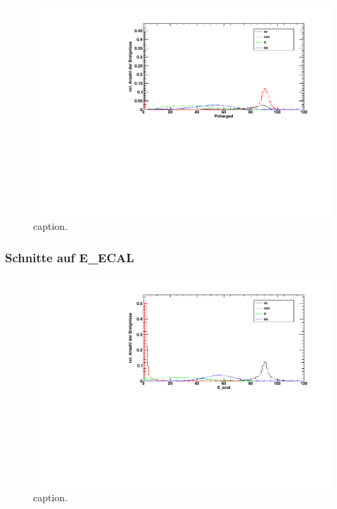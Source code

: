 \begin{figure}[H]
\begin{center}
  \includegraphics[width=\textwidth]{../img/dist_Pcharged.pdf}
  \caption{caption.}
  \label{img:dist_Pcharged}
\end{center}
\end{figure} 

\subsubsection*{Schnitte auf E\_ECAL}

\begin{figure}[H]
\begin{center}
  \includegraphics[width=\textwidth]{../img/dist_E_ecal.pdf}
  \caption{caption.}
  \label{img:dist_E_ecal}
\end{center}
\end{figure} 

